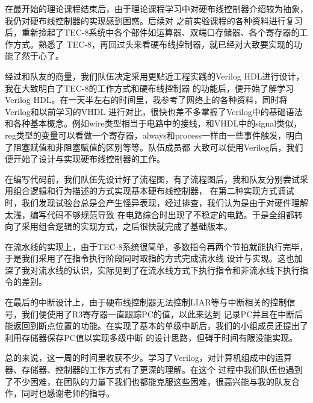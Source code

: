 在最开始的理论课程结束后，由于理论课程学习中对硬布线控制器介绍较为抽象，我仍对硬布线控制器的实现感到困惑。后续对
之前实验课程的各种资料进行复习后，重新捡起了TEC-8系统中各个部件如运算器、双端口存储器、各个寄存器的工作方式。熟悉了
TEC-8，再回过头来看硬布线控制器，就已经对大致要实现的功能了然于心了。

经过和队友的商量，我们队伍决定采用更贴近工程实践的Verilog HDL进行设计，我在大致明白了TEC-8的工作方式和硬布线控制器
的功能后，便开始了解学习Verilog HDL。在一天半左右的时间里，我参考了网络上的各种资料，同时将Verilog和以前学习的VHDL
进行对比，很快也差不多掌握了Verilog中的基础语法和各种基本概念。例如wire类型相当于电路中的接线，和VHDL中的signal类似，
reg类型的变量可以看做一个寄存器，always和process一样由一些事件触发，明白了阻塞赋值和非阻塞赋值的区别等等。队伍成员都
大致可以使用Verilog后，我们便开始了设计与实现硬布线控制器的工作。

在编写代码前，我们队伍先设计好了流程图，有了流程图后，我和队友分别尝试采用组合逻辑和行为描述的方式实现基本硬布线控制器，
在第二种实现方式调试时，我们发现试验台总是会产生怪异表现，经过排查，我们认为是由于对硬件理解太浅，编写代码不够规范导致
在电路综合时出现了不稳定的电路。于是全组都转向了采用组合逻辑的实现方式，之后很快就完成了基础版本。

在流水线的实现上，由于TEC-8系统很简单，多数指令再两个节拍就能执行完毕，于是我们采用了在指令执行阶段同时取指的方式完成流水线
设计与实现。这也加深了我对流水线的认识，实际见到了在流水线方式下执行指令和非流水线下执行指令的差别。

在最后的中断设计上，由于硬布线控制器无法控制LIAR等与中断相关的控制信号，我们便使用了R3寄存器一直跟踪PC的值，以此来达到
记录PC并且在中断后能返回到断点位置的功能。在实现了基本的单级中断后，我们的小组成员还提出了利用存储器保存PC值以实现多级中断
的设计思路，但碍于时间有限没能实现。

总的来说，这一周的时间里收获不少。学习了Verilog，对计算机组成中的运算器、存储器、控制器的工作方式有了更深的理解。在这个
过程中我们队伍也遇到了不少困难，在团队的力量下我们也都能克服这些困难，很高兴能与我的队友合作，同时也感谢老师的指导。
